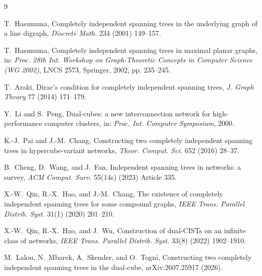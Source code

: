 \documentclass[11pt]{article}
\theoremstyle{remark}
\begin{document}
\begin{thebibliography}{9}

T.~Hasunuma,
Completely independent spanning trees in the underlying graph of a line
digraph, \emph{Discrete Math.} 234 (2001) 149--157.

T.~Hasunuma,
Completely independent spanning trees in maximal planar graphs,
in: \emph{Proc. 28th Int. Workshop on Graph-Theoretic Concepts in Computer
Science (WG 2002)}, LNCS 2573, Springer, 2002, pp. 235--245.

T.~Araki,
Dirac's condition for completely independent spanning trees,
\emph{J. Graph Theory} 77 (2014) 171--179.

Y.~Li and S.~Peng,
Dual-cubes: a new interconnection network for high-performance computer
clusters, in: \emph{Proc. Int. Computer Symposium}, 2000.

K.-J.~Pai and J.-M.~Chang,
Constructing two completely independent spanning trees in hypercube-variant
networks, \emph{Theor. Comput. Sci.} 652 (2016) 28--37.

B.~Cheng, D.~Wang, and J.~Fan,
Independent spanning trees in networks: a survey,
\emph{ACM Comput. Surv.} 55(14s) (2023) Article 335.

X.-W.~Qin, R.-X.~Hao, and J.-M.~Chang,
The existence of completely independent spanning trees for some compound
graphs, \emph{IEEE Trans. Parallel Distrib. Syst.} 31(1) (2020) 201--210.

X.-W.~Qin, R.-X.~Hao, and J.~Wu,
Construction of dual-CISTs on an infinite class of networks,
\emph{IEEE Trans. Parallel Distrib. Syst.} 33(8) (2022) 1902--1910.

M.~Lalou, N.~Mbarek, A.~Skender, and O.~Togni,
Constructing two completely independent spanning trees in the dual-cube,
arXiv:2607.25917 (2026).

\end{thebibliography}
\end{document}

